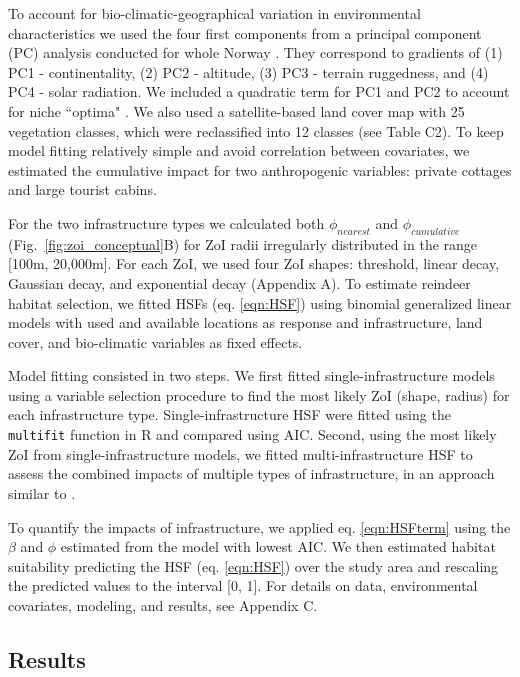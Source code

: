 \documentclass[titlepage]{article}
\begin{document}
To account for bio-climatic-geographical variation in environmental characteristics we used the four first components from a principal component (PC) analysis conducted for whole Norway \citep{bakkestuen_step-less_2008}. They correspond to gradients of (1) PC1 - continentality, (2) PC2 - altitude, (3) PC3 - terrain ruggedness, and (4) PC4 - solar radiation. We included a quadratic term for PC1 and PC2 to account for niche ``optima" \citep[\textit{sensu}][]{panzacchi_searching_2015}. We also used a satellite-based land cover map with 25 vegetation classes, which were reclassified into 12 classes (see Table C2). To keep model fitting relatively simple and avoid correlation between covariates, we estimated the cumulative impact for two anthropogenic variables: private cottages and large tourist cabins.

For the two infrastructure types we calculated both $\phi_{nearest}$ and $\phi_{cumulative}$ (Fig.~\ref{fig:zoi_conceptual}B) for ZoI radii irregularly distributed in the range [100m, 20,000m]. For each ZoI, we used four ZoI shapes: threshold, linear decay, Gaussian decay, and exponential decay (Appendix A). To estimate reindeer habitat selection, we fitted HSFs (eq. \ref{eqn:HSF}) using binomial generalized linear models \citep{fieberg_how_2021} with used and available locations as response and infrastructure, land cover, and bio-climatic variables as fixed effects. 

Model fitting consisted in two steps. We first fitted single-infrastructure models using a variable selection procedure \citep{burnham_model_2002} to find the most likely ZoI (shape, radius) for each infrastructure type. Single-infrastructure HSF were fitted using the \verb|multifit| function in R \citep{huais_multifit_2018} and compared using AIC. Second, using the most likely ZoI from single-infrastructure models, we fitted multi-infrastructure HSF to assess the combined impacts of multiple types of infrastructure, in an approach similar to \citet{laforge_process-focussed_2015}. 

To quantify the impacts of infrastructure, we applied eq. \ref{eqn:HSFterm} using the $\beta$ and $\phi$ estimated from the model with lowest AIC. We then estimated habitat suitability predicting the HSF (eq. \ref{eqn:HSF}) over the study area and rescaling the predicted values to the interval [0, 1]. For details on data, environmental covariates, modeling, and results, see Appendix C.

\subsection{Results}
\end{document}
